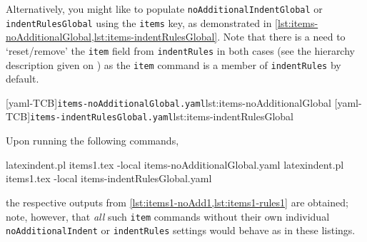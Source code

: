  \begin{example}
 Alternatively, you might like to populate \texttt{noAdditionalIndentGlobal} or
 \texttt{indentRulesGlobal} using the \texttt{items} key, as demonstrated in
 \cref{lst:items-noAdditionalGlobal,lst:items-indentRulesGlobal}. Note that there is a
 need to `reset/remove' the \texttt{item} field from \texttt{indentRules} in both cases
 (see the hierarchy description given on ) as the
 \texttt{item} command is a member of \texttt{indentRules} by default.

 \begin{cmhtcbraster}
  [yaml-TCB]{\texttt{items-noAdditionalGlobal.yaml}}{lst:items-noAdditionalGlobal}
  [yaml-TCB]{\texttt{items-indentRulesGlobal.yaml}}{lst:items-indentRulesGlobal}
 \end{cmhtcbraster}

 Upon running the following commands, 

 \begin{commandshell}
latexindent.pl items1.tex -local items-noAdditionalGlobal.yaml
latexindent.pl items1.tex -local items-indentRulesGlobal.yaml
\end{commandshell}

 the respective outputs from \cref{lst:items1-noAdd1,lst:items1-rules1} are obtained;
 note, however, that \emph{all} such \texttt{item} commands without their own individual
 \texttt{noAdditionalIndent} or \texttt{indentRules} settings would behave as in these
 listings.
 \end{example}
